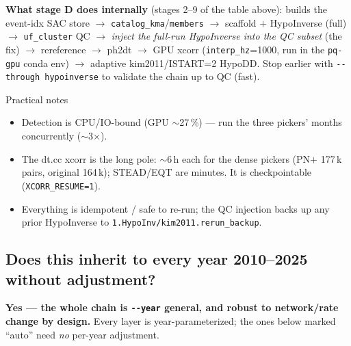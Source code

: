 \documentclass[11pt]{article}
\begin{document}
\noindent\textbf{What stage D does internally} (stages 2--9 of the table above): builds the event-idx SAC
store $\rightarrow$ \texttt{catalog\_kma}/\texttt{members} $\rightarrow$ scaffold $+$ HypoInverse (full)
$\rightarrow$ \texttt{uf\_cluster} QC $\rightarrow$ \emph{inject the full-run HypoInverse into the QC
subset} (the fix) $\rightarrow$ rereference $\rightarrow$ ph2dt $\rightarrow$ GPU xcorr
(\texttt{interp\_hz}=1000, run in the \texttt{pq-gpu} conda env) $\rightarrow$ adaptive kim2011/ISTART=2
HypoDD. Stop earlier with \texttt{-{}-through hypoinverse} to validate the chain up to QC (fast).

\begin{keybox}{Practical notes}
\begin{itemize}[leftmargin=5mm,itemsep=0.5mm]
\item Detection is CPU/IO-bound (GPU $\sim$27\,\%) --- run the three pickers' months concurrently ($\sim$3$\times$).
\item The dt.cc xcorr is the long pole: $\sim$6\,h each for the dense pickers (PN$+$ 177\,k pairs,
original 164\,k); STEAD/EQT are minutes. It is checkpointable (\texttt{XCORR\_RESUME=1}).
\item Everything is idempotent / safe to re-run; the QC injection backs up any prior HypoInverse to
\texttt{1.HypoInv/kim2011.rerun\_backup}.
\end{itemize}
\end{keybox}

\subsection{Does this inherit to every year 2010--2025 without adjustment?}

\textbf{Yes --- the whole chain is \texttt{-{}-year} general, and robust to network/rate change by design.}
Every layer is year-parameterized; the ones below marked ``auto'' need \emph{no} per-year adjustment.
\end{document}
